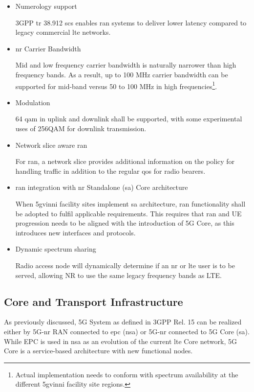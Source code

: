 \begin{itemize}
        \item Numerology support 
        
        3GPP \acrshort{tr} 38.912 \cite{3GPP_TR_38.912} \acrfull{scs} enables \acrshort{ran} systems to deliver lower latency compared to legacy commercial \acrshort{lte} networks.
\newpage
        \item \acrshort{nr} Carrier Bandwidth
        
        Mid and low frequency carrier bandwidth is naturally narrower than high frequency bands. As a result, up to 100 MHz carrier bandwidth can be supported for mid-band versus 50 to 100 MHz in high frequencies\footnote{Actual implementation needs to conform with spectrum availability at the different \acrshort{5gvinni} facility site regions.}.
        
        \item Modulation
        
        64 \acrfull{qam} in uplink and downlink shall be supported, with some experimental uses of 256QAM for downlink transmission. 
        
        \item Network slice aware \acrshort{ran}
        
        For \acrshort{ran}, a network slice provides additional information on the policy for handling traffic in addition to the regular \acrshort{qos} for radio bearers.
        
        \item \acrshort{ran} integration with \acrshort{nr} Standalone (\acrshort{sa}) Core architecture
        
        When \acrshort{5gvinni} facility sites implement \acrshort{sa} architecture, \acrshort{ran} functionality shall be adopted to fulfil applicable requirements. This requires that \acrshort{ran} and UE progression needs to be aligned with the introduction of 5G Core, as this introduces new interfaces and protocols.

        \item Dynamic spectrum sharing
        
        Radio access node will dynamically determine if an \acrshort{nr} or \acrshort{lte} user is to be served, allowing NR to use the same legacy frequency bands as LTE.

    \end{itemize}
    
    \subsection{Core and Transport Infrastructure}
    \label{chap:vinni-core-transport-infrastructure}
    As previously discussed, 5G System as defined in 3GPP Rel. 15 can be realized either by 5G-\acrshort{nr} RAN connected to \acrshort{epc} (\acrshort{nsa}) or 5G-\acrshort{nr} connected to 5G Core (\acrshort{sa}). While EPC is used in \acrshort{nsa} as an evolution of the current \acrshort{lte} Core network, 5G Core is a service-based architecture with new functional nodes. 

